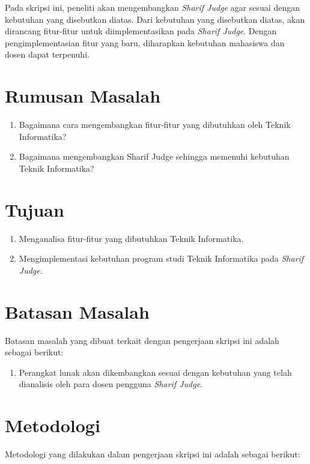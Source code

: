 Pada skripsi ini, peneliti akan mengembangkan \textit{Sharif Judge} agar sesuai dengan kebutuhan yang disebutkan diatas. Dari kebutuhan yang disebutkan diatas, akan dirancang fitur-fitur untuk diimplementasikan pada \textit{Sharif Judge}. Dengan pengimplementasian fitur yang baru, diharapkan kebutuhan mahasiswa dan dosen dapat terpenuhi.

\section{Rumusan Masalah}
\label{sec:rumusan}
\begin{enumerate}
	\item Bagaimana cara mengembangkan fitur-fitur yang dibutuhkan oleh Teknik Informatika?
	\item Bagaimana mengembangkan Sharif Judge sehingga memenuhi kebutuhan Teknik Informatika?
\end{enumerate}

\section{Tujuan}
\label{sec:tujuan}
\begin{enumerate}
	\item Menganalisa fitur-fitur yang dibutuhkan Teknik Informatika.
	\item Mengimplementasi kebutuhan program studi Teknik Informatika pada \textit{Sharif Judge}.
\end{enumerate}

\section{Batasan Masalah}
\label{sec:batasan}
Batasan masalah yang dibuat terkait dengan pengerjaan skripsi ini adalah sebagai berikut:
\begin{enumerate}
	\item Perangkat lunak akan dikembangkan sesuai dengan kebutuhan yang telah dianalisis oleh para dosen pengguna \textit{Sharif Judge}.
\end{enumerate}

\section{Metodologi}
\label{sec:metlit}Metodologi yang dilakukan dalam pengerjaan skripsi ini adalah sebagai berikut:

